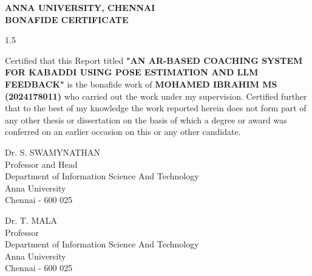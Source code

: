 \documentclass[12pt, a4paper]{report}
\begin{document}
\setcounter{page}{1}
\begin{center}
    {\fontsize{18pt}{21.6pt}\selectfont \textbf{ANNA UNIVERSITY, CHENNAI}}\\[1.5cm]
    {\fontsize{16pt}{19.2pt}\selectfont \textbf{BONAFIDE CERTIFICATE}}\\[1.5cm]
\end{center}

\begin{spacing}{1.5} %
{\fontsize{13pt}{15.6pt}\selectfont
{} %
\sloppy %
Certified that this Report titled \textbf{"AN AR-BASED COACHING SYSTEM FOR KABADDI USING POSE ESTIMATION AND LLM FEEDBACK"} is the bonafide work of \textbf{MOHAMED IBRAHIM MS (2024178011)} who carried out the work under my supervision. Certified further that to the best of my knowledge the work reported herein does not form part of any other thesis or dissertation on the basis of which a degree or award was conferred on an earlier occasion on this or any other candidate.
\par}
\end{spacing}

\vspace{5cm}

\noindent
\begin{minipage}[t]{0.45\textwidth}
\flushleft
Dr. S. SWAMYNATHAN\\
Professor and Head\\
Department of Information Science And Technology\\
Anna University\\
Chennai - 600 025
\end{minipage}
\hfill
\begin{minipage}[t]{0.45\textwidth}
\flushleft
Dr. T. MALA\\
Professor\\
Department of Information Science And Technology\\
Anna University\\
Chennai - 600 025
\end{minipage}
\end{document}
